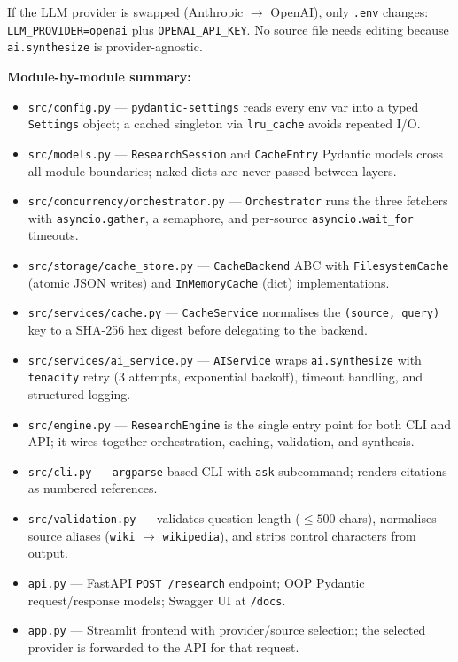 \documentclass[11pt,a4paper]{article}
\begin{document}
If the LLM provider is swapped (Anthropic $\to$ OpenAI), only \texttt{.env} changes: \texttt{LLM\_PROVIDER=openai} plus \texttt{OPENAI\_API\_KEY}. No source file needs editing because \texttt{ai.synthesize} is provider-agnostic.

\textbf{Module-by-module summary:}
\begin{itemize}[noitemsep]
  \item \texttt{src/config.py} --- \texttt{pydantic-settings} reads every env var into a typed \texttt{Settings} object; a cached singleton via \texttt{lru\_cache} avoids repeated I/O.
  \item \texttt{src/models.py} --- \texttt{ResearchSession} and \texttt{CacheEntry} Pydantic models cross all module boundaries; naked dicts are never passed between layers.
  \item \texttt{src/concurrency/orchestrator.py} --- \texttt{Orchestrator} runs the three fetchers with \texttt{asyncio.gather}, a semaphore, and per-source \texttt{asyncio.wait\_for} timeouts.
  \item \texttt{src/storage/cache\_store.py} --- \texttt{CacheBackend} ABC with \texttt{FilesystemCache} (atomic JSON writes) and \texttt{InMemoryCache} (dict) implementations.
  \item \texttt{src/services/cache.py} --- \texttt{CacheService} normalises the \texttt{(source, query)} key to a SHA-256 hex digest before delegating to the backend.
  \item \texttt{src/services/ai\_service.py} --- \texttt{AIService} wraps \texttt{ai.synthesize} with \texttt{tenacity} retry (3 attempts, exponential backoff), timeout handling, and structured logging.
  \item \texttt{src/engine.py} --- \texttt{ResearchEngine} is the single entry point for both CLI and API; it wires together orchestration, caching, validation, and synthesis.
  \item \texttt{src/cli.py} --- \texttt{argparse}-based CLI with \texttt{ask} subcommand; renders citations as numbered references.
  \item \texttt{src/validation.py} --- validates question length ($\leq 500$ chars), normalises source aliases (\texttt{wiki} $\to$ \texttt{wikipedia}), and strips control characters from output.
  \item \texttt{api.py} --- FastAPI \texttt{POST /research} endpoint; OOP Pydantic request/response models; Swagger UI at \texttt{/docs}.
  \item \texttt{app.py} --- Streamlit frontend with provider/source selection; the selected provider is forwarded to the API for that request.
\end{itemize}
\end{document}
